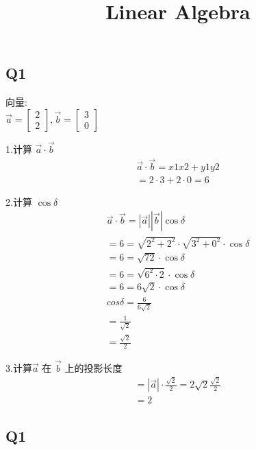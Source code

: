 \documentclass[12pt]{article}
\title{Linear Algebra}
\date{}
\begin{document}
\maketitle

\subsection*{Q1}
\begin{flushleft}
向量:\\
$\vec{a} = \begin{bmatrix}
    2 \\
    2 
\end{bmatrix},\vec{b} = \begin{bmatrix}
    3  \\
    0 
\end{bmatrix}$

1.计算 $\vec{a} \cdot \vec{b}$
\begin{align}
     \vec{a} \cdot \vec{b} = x1x2  +  y1y2 \\
      = 2\cdot 3 +  2 \cdot 0 
      = 6 
\end{align}

2.计算 $\cos \delta$
\begin{align}
     \vec{a} \cdot \vec{b} = |\vec{a}| |\vec{b}| \cos\delta \\
     = 6 = \sqrt{2^{2} + 2^{2}} \cdot \sqrt{3^{2} + 0^{2}} \cdot \cos\delta \\
     = 6 = \sqrt{72} \cdot \cos\delta \\
     = 6 = \sqrt{6^{2} \cdot 2} \cdot \cos\delta\\ 
     = 6 = 6\sqrt{2}\cdot \cos\delta\\ 
     cos\delta  = \frac{6}{6\sqrt{2}} \\
                = \frac{1}{\sqrt{2}} \\
                = \frac{\sqrt{2}}{2}
\end{align}

3.计算$\vec{a}$ 在 $\vec{b}$ 上的投影长度
\begin{align}
    = |\vec{a}| \cdot \frac{\sqrt{2}}{2}
    = 2\sqrt{2} \frac{\sqrt{2}}{2} \\ 
    = 2
\end{align}
\end{flushleft}


\subsection*{Q1}
\end{document}
